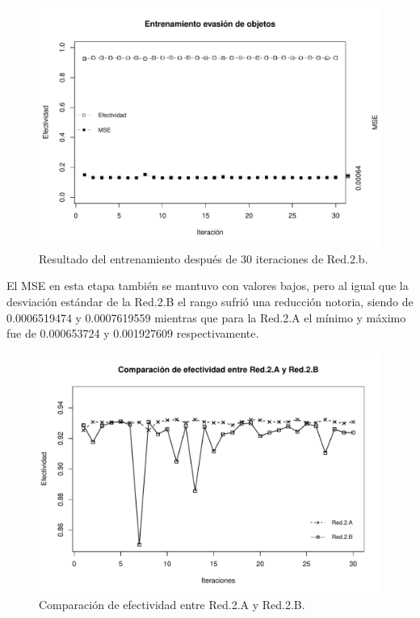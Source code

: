 \documentclass{iccmemoria}
\begin{document}
\begin{figure}
  \centering
  \includegraphics[width = 450pt]{images/plot_net_2_b.pdf}
  \caption[Entrenamiento segunda etapa Red.2.A.]{Resultado del entrenamiento después de 30 iteraciones de Red.2.b.}
  \label{fig:net.2.b}
\end{figure}

El MSE en esta etapa también se mantuvo con valores bajos, pero al igual que la desviación estándar de la Red.2.B el rango sufrió una reducción notoria, siendo de 0.0006519474 y 0.0007619559 mientras que para la Red.2.A el mínimo y máximo fue de 0.000653724 y 0.001927609 respectivamente.\\

\begin{figure}[H]
  \centering
  \includegraphics[width = 450pt]{images/net_2_a_vs_net_2_b.pdf}
  \caption[Efectividad de Red.2.A vs Red.2.B.]{Comparación de efectividad entre Red.2.A y Red.2.B.}
  \label{fig:net.2.a vs net.2.b}
\end{figure}
\end{document}
